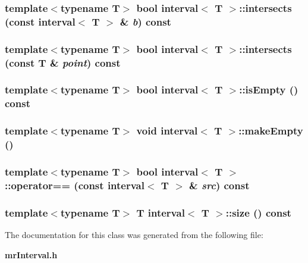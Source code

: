 \subsubsection{\setlength{\rightskip}{0pt plus 5cm}template$<$typename T$>$ bool {\bf interval}$<$ T $>$::intersects (const {\bf interval}$<$ T $>$ \& {\em b}) const}\label{classinterval_a9}


\subsubsection{\setlength{\rightskip}{0pt plus 5cm}template$<$typename T$>$ bool {\bf interval}$<$ T $>$::intersects (const T \& {\em point}) const}\label{classinterval_a8}


\subsubsection{\setlength{\rightskip}{0pt plus 5cm}template$<$typename T$>$ bool {\bf interval}$<$ T $>$::is\-Empty () const}\label{classinterval_a11}


\subsubsection{\setlength{\rightskip}{0pt plus 5cm}template$<$typename T$>$ void {\bf interval}$<$ T $>$::make\-Empty ()}\label{classinterval_a3}


\subsubsection{\setlength{\rightskip}{0pt plus 5cm}template$<$typename T$>$ bool {\bf interval}$<$ T $>$::operator== (const {\bf interval}$<$ T $>$ \& {\em src}) const}\label{classinterval_a2}


\subsubsection{\setlength{\rightskip}{0pt plus 5cm}template$<$typename T$>$ T {\bf interval}$<$ T $>$::size () const}\label{classinterval_a6}




The documentation for this class was generated from the following file:\begin{CompactItemize}
\item 
{\bf mr\-Interval.h}\end{CompactItemize}
